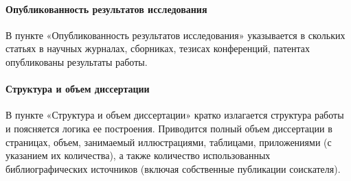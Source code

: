\paragraph{Опубликованность результатов исследования}
В пункте «Опубликованность результатов исследования» указывается в скольких
статьях в научных журналах, сборниках, тезисах конференций, патентах
опубликованы результаты работы.

\paragraph{Структура и объем диссертации}
В пункте «Структура и объем диссертации» кратко излагается структура работы и
поясняется логика ее построения.
Приводится полный объем диссертации в страницах, объем,
занимаемый иллюстрациями, таблицами, приложениями (с указанием их
количества), а также количество использованных библиографических
источников (включая собственные публикации соискателя).